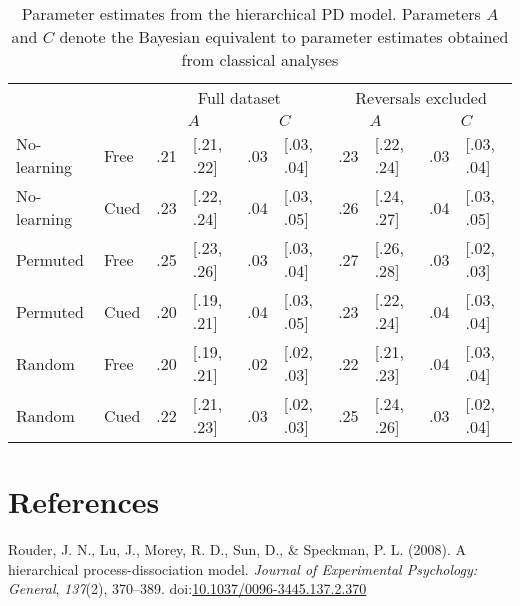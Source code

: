 \documentclass[american,floatsintext,doc]{apa6}
\begin{document}
\clearpage

\begin{table}[tbp]
\centering
\caption{Parameter estimates from the hierarchical PD model. Parameters $A$ and $C$ denote the Bayesian equivalent to parameter estimates obtained from classical analyses}
\begin{center}
\begin{threeparttable}
\begin{tabular}{llllllllll}
\toprule
\multicolumn{2}{l}{} & \multicolumn{4}{c}{Full dataset} & \multicolumn{4}{c}{Reversals excluded}\\
\multicolumn{2}{l}{} & \multicolumn{2}{c}{$A$} & \multicolumn{2}{c}{$C$} & \multicolumn{2}{c}{$A$} & \multicolumn{2}{c}{$C$}\\
\midrule
No-learning & Free & .21 & [.21, .22] & .03 & [.03, .04] & .23 & [.22, .24] & .03 & [.03, .04]\\
No-learning & Cued & .23 & [.22, .24] & .04 & [.03, .05] & .26 & [.24, .27] & .04 & [.03, .05]\\
Permuted & Free & .25 & [.23, .26] & .03 & [.03, .04] & .27 & [.26, .28] & .03 & [.02, .03]\\
Permuted & Cued & .20 & [.19, .21] & .04 & [.03, .05] & .23 & [.22, .24] & .04 & [.03, .04]\\
Random & Free & .20 & [.19, .21] & .02 & [.02, .03] & .22 & [.21, .23] & .04 & [.03, .04]\\
Random & Cued & .22 & [.21, .23] & .03 & [.02, .03] & .25 & [.24, .26] & .03 & [.02, .04]\\
\bottomrule
\end{tabular}
\end{threeparttable}
\end{center}
\end{table}

\section*{References}\label{references}

Rouder, J. N., Lu, J., Morey, R. D., Sun, D., \& Speckman, P. L. (2008).
A hierarchical process-dissociation model. \emph{Journal of Experimental
Psychology: General}, \emph{137}(2), 370--389.
doi:\href{http://dx.doi.org/10.1037/0096-3445.137.2.370}{10.1037/0096-3445.137.2.370}
\end{document}
